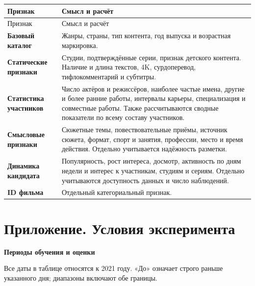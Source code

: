 \documentclass[11pt,a4paper]{article}
\begin{document}
\begin{longtable}{>{\raggedright\arraybackslash}p{4.1cm}>{\raggedright\arraybackslash}p{10.8cm}}
\toprule
Признак & Смысл и расчёт \\
\midrule
\endfirsthead
\toprule
Признак & Смысл и расчёт \\
\midrule
\endhead
\textbf{Базовый каталог} & Жанры, страны, тип контента, год выпуска и возрастная маркировка. \\[4pt]
\textbf{Статические признаки} & Студии, подтверждённые серии, признак детского контента. Наличие и длина текстов, 4K, сурдоперевод, тифлокомментарий и субтитры. \\[4pt]
\textbf{Статистика участников} & Число актёров и режиссёров, наиболее частые имена, другие и более ранние работы, интервалы карьеры, специализация и совместные работы. Также рассчитываются сводные показатели по всему составу участников. \\[4pt]
\textbf{Смысловые признаки} & Сюжетные темы, повествовательные приёмы, источник сюжета, формат, спорт и занятия, профессии, место и время действия. Отдельно учитывается надёжность разметки. \\[4pt]
\textbf{Динамика кандидата} & Популярность, рост интереса, досмотр, активность по дням недели и интерес к участникам, студиям и сериям. Отдельно учитываются доступность данных и число наблюдений. \\[4pt]
\textbf{ID фильма} & Отдельный категориальный признак. \\[4pt]
\bottomrule
\end{longtable}

\newpage

\section{Приложение. Условия эксперимента}

\textbf{Периоды обучения и оценки}

Все даты в таблице относятся к 2021 году. «До» означает строго раньше указанного дня; диапазоны включают обе границы.
\end{document}
